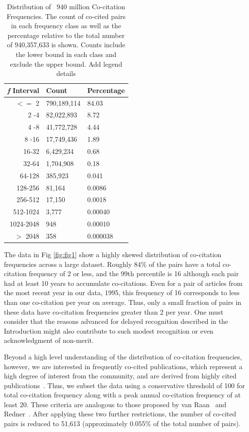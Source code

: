 \documentclass[utf8]{frontiersSCNS}
\newcommand\Tstrut{\rule{0pt}{2.9ex}} %
\begin{document}
\begin{table}[ht]
\caption{Distribution of ~940 million Co-citation Frequencies. The count of co-cited pairs in each frequency class as well as the percentage relative to the total number of 940,357,633 is shown. Counts include the lower bound in each class and exclude the upper bound. Add legend details}%
\centering %
\begin{center}
\begin{tabular}{rll} 
\emph{f} Interval & Count & Percentage \\
\hline %
$<=$ 2 & 790,189,114 & 84.03 \Tstrut\\ 
2 -4 & 82,022,893 & 8.72 \\
4 -8 & 41,772,728 & 4.44 \\
8 -16 & 17,749,436 & 1.89 \\
16-32 & 6,429,234 & 0.68\\
32-64 & 1,704,908 & 0.18\\
64-128 & 385,923 & 0.041\\
128-256 & 81,164 & 0.0086\\ 
256-512 & 17,150 & 0.0018\\
512-1024 & 3,777 & 0.00040\\
1024-2048 & 948 & 0.00010\\ 
$> $ 2048 & 358 & 0.000038\\   
\hline 
\end{tabular}
\end{center}
\label{tab:table1} %
\end{table}


The data in Fig \ref{fig:fig1} show a highly skewed distribution of co-citation frequencies across a large dataset. Roughly 84\% of the pairs have a total co-citation frequency of 2 or less, and the 99th percentile is 16 although each pair had at least 10 years to accumulate co-citations. Even for a pair of articles from the most recent year in our data, 1995, this frequency of 16 corresponds to less than one co-citation per year on average. Thus, only a small fraction of pairs in these data have co-citation frequencies greater than 2 per year. One must consider that the reasons advanced for delayed recognition described in the Introduction might also contribute to such modest recognition or even acknowledgment of non-merit.

Beyond a high level understanding of the distribution of co-citation frequencies, however, we are interested in frequently co-cited publications, which represent a high degree of interest from the community, and are derived from highly cited publications~\citep{Small1973}. Thus, we subset the data using a conservative threshold of 100 for total co-citation frequency along with a peak annual co-citation frequency of at least 20. These criteria are analogous to those proposed by van Raan~\citep{Raan2004} and Redner~\citep{redner_2005}. After applying these two further restrictions, the number of co-cited pairs is reduced to 51,613 (approximately 0.055\% of the total number of pairs).
\end{document}
